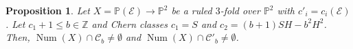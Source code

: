 \documentclass[11pt,twoside]{amsart}
\newtheorem{proposition}[theorem]{Proposition}
\theoremstyle{definition}
\newcommand {\Closure}{\mathrm{Closure}}
\newcommand{\Num}{\operatorname{Num}}
\begin{document}
\begin{proposition}
Let $X=\mathbb{P}(\mathcal{E})\rightarrow\mathbb{P}^2$ be a ruled $3$-fold over $\mathbb{P}^2$ with $c'_i=c_i(\mathcal{E})$.  Let $c_1+1\leq b\in\mathbb{Z}$ and Chern classes $c_1=S$ and $c_2=(b+1)SH-b^2H^2$.
    Then, $\Num(X)\cap \mathcal{C}_b\neq\emptyset$ and $\Num(X)\cap \mathcal{C}'_b\neq\emptyset$. 
    
\end{proposition}
\end{document}
